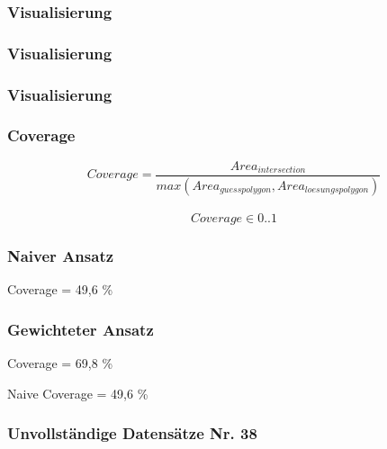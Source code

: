\begin{frame}
  \frametitle{Visualisierung}
\end{frame}

\begin{frame}
  \frametitle{Visualisierung}
\end{frame}

\begin{frame}
  \frametitle{Visualisierung}
\end{frame}

\begin{frame}
  \frametitle{Coverage}
  \begin{equation*}
    Coverage = \frac{Area_{intersection}}{max(Area_{guesspolygon},Area_{loesungspolygon})}
  \end{equation*}
\\
  \begin{equation*}
    Coverage \in {0..1}
  \end{equation*}
\end{frame}

\begin{frame}
  \frametitle{Naiver Ansatz}
  \begin{center}
  \huge{Coverage = 49,6 \%}
  \end{center}
\end{frame}

\begin{frame}
  \frametitle{Gewichteter Ansatz}
  \begin{center}
  \huge{Coverage = 69,8 \%}
  \end{center}
  \begin{center}
  Naive Coverage = 49,6 \%
  \end{center}
\end{frame}


\begin{frame}
  \frametitle{Unvollständige Datensätze \hfill Nr. 38}
\end{frame}



